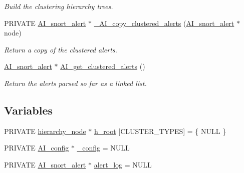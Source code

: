 \begin{DoxyCompactItemize}
\begin{DoxyCompactList}\small\item\em Build the clustering hierarchy trees. \item\end{DoxyCompactList}\item 
PRIVATE \hyperlink{struct__AI__snort__alert}{AI\_\-snort\_\-alert} $\ast$ \hyperlink{group__cluster_gab4c8ab92691e85a6f0ac4abb122712fd}{\_\-AI\_\-copy\_\-clustered\_\-alerts} (\hyperlink{struct__AI__snort__alert}{AI\_\-snort\_\-alert} $\ast$node)
\begin{DoxyCompactList}\small\item\em Return a copy of the clustered alerts. \item\end{DoxyCompactList}\item 
\hyperlink{struct__AI__snort__alert}{AI\_\-snort\_\-alert} $\ast$ \hyperlink{group__cluster_ga2553c678eeb83282c230d649a0e8fcd4}{AI\_\-get\_\-clustered\_\-alerts} ()
\begin{DoxyCompactList}\small\item\em Return the alerts parsed so far as a linked list. \item\end{DoxyCompactList}\end{DoxyCompactItemize}
\subsection*{Variables}
\begin{DoxyCompactItemize}
\item 
PRIVATE \hyperlink{struct__hierarchy__node}{hierarchy\_\-node} $\ast$ \hyperlink{group__cluster_ga97d35425cf5a0207fb50b64ee8cdda82}{h\_\-root} \mbox{[}CLUSTER\_\-TYPES\mbox{]} = \{ NULL \}
\item 
PRIVATE \hyperlink{structAI__config}{AI\_\-config} $\ast$ \hyperlink{group__cluster_ga91458e2d34595688e39fcb63ba418849}{\_\-config} = NULL
\item 
PRIVATE \hyperlink{struct__AI__snort__alert}{AI\_\-snort\_\-alert} $\ast$ \hyperlink{group__cluster_gaaf4c19f60f48741b0890c6114dcff7d9}{alert\_\-log} = NULL
\end{DoxyCompactItemize}


